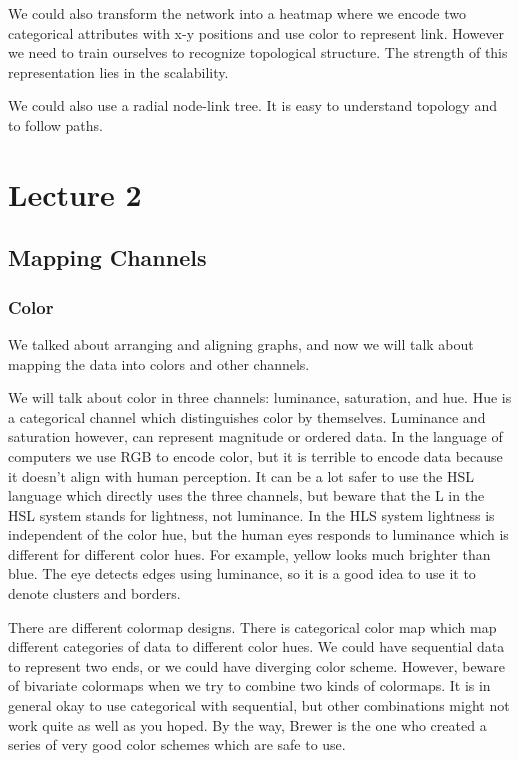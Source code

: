 \documentclass[letterpaper, 11pt]{article}
\numberwithin{equation}{section}
\numberwithin{figure}{section}
\begin{document}
We could also transform the network into a heatmap where we encode two
categorical attributes with x-y positions and use color to represent link.
However we need to train ourselves to recognize topological structure. The
strength of this representation lies in the scalability.

We could also use a radial node-link tree. It is easy to understand topology and
to follow paths.

\section{Lecture 2}
\label{sec:lec2}

\subsection{Mapping Channels}

\subsubsection{Color}

We talked about arranging and aligning graphs, and now we will talk about
mapping the data into colors and other channels.

We will talk about color in three channels: luminance, saturation, and hue. Hue
is a categorical channel which distinguishes color by themselves. Luminance and
saturation however, can represent magnitude or ordered data. In the language of
computers we use RGB to encode color, but it is terrible to encode data because
it doesn't align with human perception. It can be a lot safer to use the HSL
language which directly uses the three channels, but beware that the L in the
HSL system stands for lightness, not luminance. In the HLS system lightness is
independent of the color hue, but the human eyes responds to luminance which is
different for different color hues. For example, yellow looks much brighter than
blue. The eye detects edges using luminance, so it is a good idea to use it to
denote clusters and borders.

There are different colormap designs. There is categorical color map which map
different categories of data to different color hues. We could have sequential
data to represent two ends, or we could have diverging color scheme. However,
beware of bivariate colormaps when we try to combine two kinds of colormaps. It
is in general okay to use categorical with sequential, but other combinations
might not work quite as well as you hoped. By the way, Brewer is the one who
created a series of very good color schemes which are safe to use.
\end{document}
